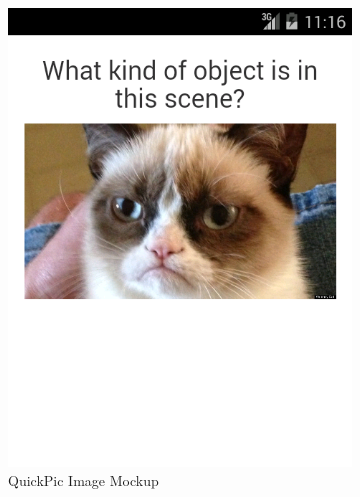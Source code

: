 \documentclass{article}
\begin{document}
\begin{figure}
  \centering
  \begin{subfigure}[b]{0.49\textwidth}
    \includegraphics[width=\textwidth]{ss_quickpic_image}
    \caption{QuickPic Image Mockup}
  \end{subfigure}
  \begin{subfigure}[b]{0.49\textwidth}

\end{subfigure}
\end{figure}
\end{document}
